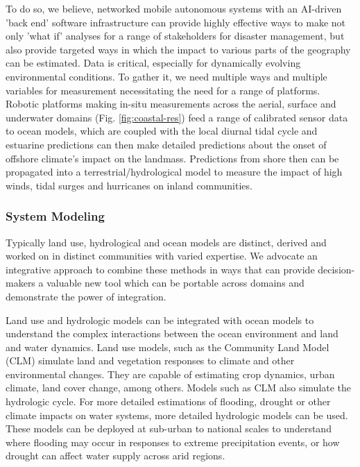 To do so, we believe, networked mobile autonomous systems with an
AI-driven 'back end' software infrastructure can provide highly
effective ways to make not only 'what if' analyses for a range of
stakeholders for disaster management, but also provide targeted ways
in which the impact to various parts of the geography can be
estimated. Data is critical, especially for dynamically evolving
environmental conditions. To gather it, we need multiple ways and
multiple variables for measurement necessitating the need for a range
of platforms. Robotic platforms making in-situ measurements across the
aerial, surface and underwater domains (Fig. \ref{fig:coastal-res})
feed a range of calibrated sensor data to ocean models, which are
coupled with the local diurnal tidal cycle and estuarine predictions
can then make detailed predictions about the onset of offshore
climate's impact on the landmass. Predictions from shore then can be
propagated into a terrestrial/hydrological model to measure the impact
of high winds, tidal surges and hurricanes on inland communities.


\subsubsection*{System Modeling}

Typically land use, hydrological and ocean models are distinct,
derived and worked on in distinct communities with varied expertise.
We advocate an integrative approach to combine these methods in ways
that can provide decision-makers a valuable new tool which can be
portable across domains and demonstrate the power of integration.

Land use and hydrologic models can be integrated with ocean models to understand the complex interactions between the ocean environment and land and water dynamics. Land use models, such as the Community Land Model (CLM) simulate land and vegetation responses to climate and other environmental changes. They are capable of estimating crop dynamics, urban climate, land cover change, among others. Models such as CLM also simulate the hydrologic cycle. For more detailed estimations of flooding, drought or other climate impacts on water systems, more detailed hydrologic models can be used. These models can be deployed at sub-urban to national scales to understand where flooding may occur in responses to extreme precipitation events, or how drought can affect water supply across arid regions.


